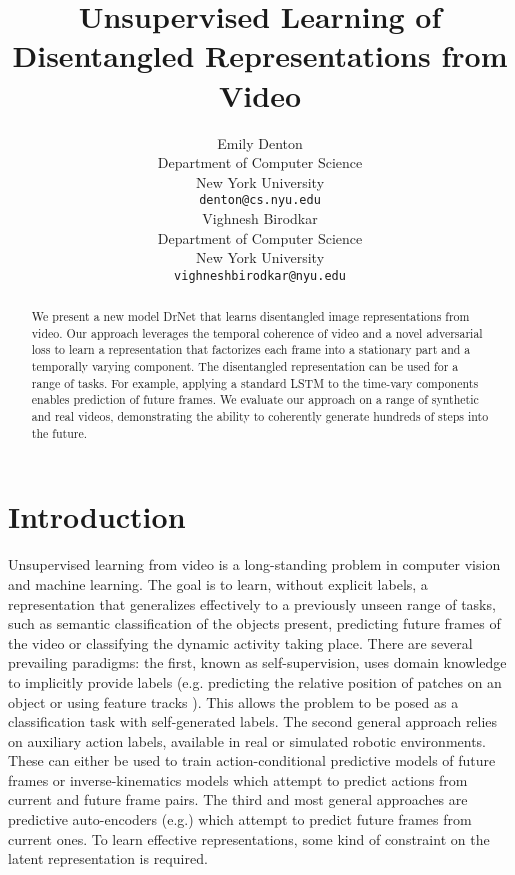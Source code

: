 \documentclass{article}
\title{Unsupervised Learning of Disentangled Representations from Video}
\author{
  Emily Denton \\
  Department of Computer Science\\
 New York University\\
  \texttt{denton@cs.nyu.edu} \\
  \And
     Vighnesh Birodkar\\
  Department of Computer Science\\
 New York University\\
  \texttt{vighneshbirodkar@nyu.edu} \\
}
\newcommand{\drnet}{{\sc DrNet} }
\begin{document}
\maketitle
\vspace{-3mm}
\begin{abstract}
  We present a new model \drnet that learns disentangled image
  representations from video. Our approach leverages the temporal
  coherence of video and a novel adversarial loss to learn a
  representation that factorizes each frame into a stationary part and
  a temporally varying component. The disentangled representation can
  be used for a range of tasks. For example, applying a standard LSTM
  to the time-vary components enables prediction of future frames. We
  evaluate our approach on a range of synthetic and real videos,  demonstrating the ability to coherently generate hundreds of steps into the future. 
\end{abstract}
\vspace{-1mm}
\vspace{-3mm}\section{Introduction}\vspace{-2mm}
Unsupervised learning from video is a long-standing problem in computer vision and machine learning. The goal is to learn, without explicit labels, a representation that generalizes effectively to a previously unseen range of tasks, such as semantic classification of the objects present, predicting future frames of the video or classifying the dynamic activity taking place. There are several prevailing paradigms: the first, known as self-supervision, uses domain knowledge to implicitly provide labels (e.g. predicting the relative position of patches on an object \cite{doersch2015unsupervised} or using feature tracks \cite{wang2015unsupervised}). This allows the problem to be posed as a classification task with self-generated labels. The second general approach relies on auxiliary action labels, available in real or simulated robotic environments. These can either be used to train action-conditional predictive models of future frames \cite{Chiappa17,oh15} or inverse-kinematics models \cite{agrawal2016learning} which attempt to predict actions from current and future frame pairs. The third and most general approaches are predictive auto-encoders (e.g.\cite{hinton2006reducing,Kalchbrenner16,Mathieu15,Srivastava15}) which attempt to predict future frames from current ones. To learn effective representations, some kind of constraint on the latent representation is required.   
\end{document}
